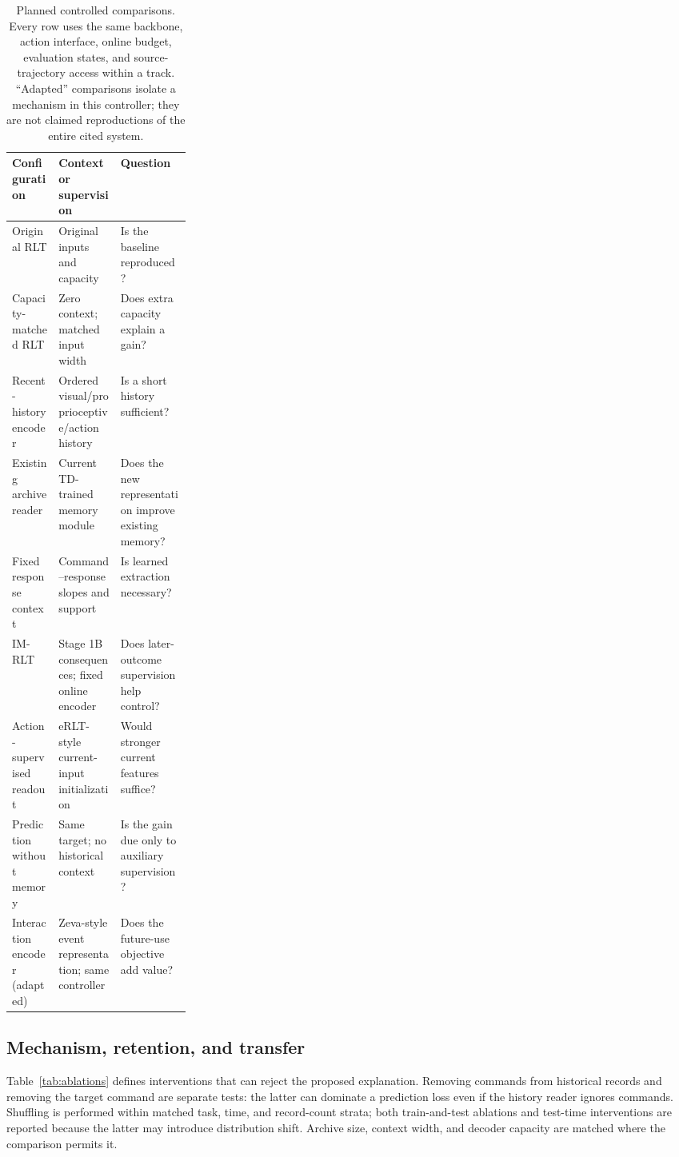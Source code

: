 \documentclass[10pt,letterpaper]{article}
\begin{document}
\begin{table}[t]
\centering\small
\caption{Planned controlled comparisons. Every row uses the same backbone, action interface, online budget, evaluation states, and source-trajectory access within a track. ``Adapted'' comparisons isolate a mechanism in this controller; they are not claimed reproductions of the entire cited system.}
\label{tab:baselines}
\begin{tabularx}{\linewidth}{@{}p{0.26\linewidth}YY@{}}
\toprule
Configuration & Context or supervision & Question \\
\midrule
Original RLT & Original inputs and capacity & Is the baseline reproduced? \\
Capacity-matched RLT & Zero context; matched input width & Does extra capacity explain a gain? \\
Recent-history encoder & Ordered visual/proprioceptive/action history & Is a short history sufficient? \\
Existing archive reader & Current TD-trained memory module & Does the new representation improve existing memory? \\
Fixed response context & Command--response slopes and support & Is learned extraction necessary? \\
IM-RLT & Stage 1B consequences; fixed online encoder & Does later-outcome supervision help control? \\
Action-supervised readout & eRLT-style current-input initialization & Would stronger current features suffice? \\
Prediction without memory & Same target; no historical context & Is the gain due only to auxiliary supervision? \\
Interaction encoder (adapted) & Zeva-style event representation; same controller & Does the future-use objective add value? \\
\bottomrule
\end{tabularx}
\end{table}

\subsection{Mechanism, retention, and transfer}
Table~\ref{tab:ablations} defines interventions that can reject the proposed explanation. Removing commands from historical records and removing the target command are separate tests: the latter can dominate a prediction loss even if the history reader ignores commands. Shuffling is performed within matched task, time, and record-count strata; both train-and-test ablations and test-time interventions are reported because the latter may introduce distribution shift. Archive size, context width, and decoder capacity are matched where the comparison permits it.
\end{document}
